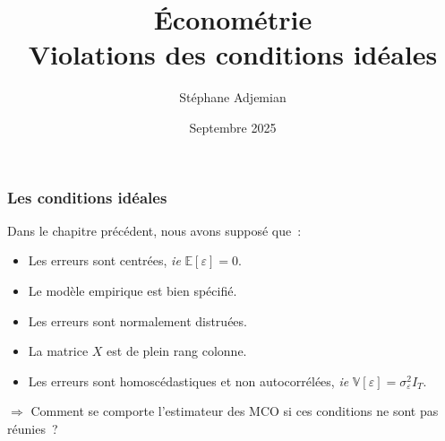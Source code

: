 \documentclass[10pt]{beamer}
\newcommand{\epsvar}{\sigma_{\varepsilon}^2}
\theoremstyle{plain}
\begin{document}
\title{Économétrie\\\small{Violations des conditions idéales}}
\author[S. Adjemian]{Stéphane Adjemian}
\date{Septembre 2025}

\begin{frame}
  \titlepage{}
\end{frame}


\begin{frame}
  \frametitle{Les conditions idéales}

  Dans le chapitre précédent, nous avons supposé que~:\newline

  \medskip

  \begin{itemize}

  \item Les erreurs sont centrées, \textit{ie} $\mathbb E[\varepsilon]=0$.\newline

  \item Le modèle empirique est bien spécifié.\newline

  \item Les erreurs sont normalement distruées.\newline

  \item La matrice $X$ est de plein rang colonne.\newline

  \item Les erreurs sont homoscédastiques et non autocorrélées, \textit{ie}  $\mathbb V[\varepsilon] = \epsvar I_T$.\newline

  \end{itemize}

  \medskip

  $\Rightarrow$ Comment se comporte l'estimateur des MCO si ces conditions ne sont pas réunies~?

\end{frame}
\end{document}
